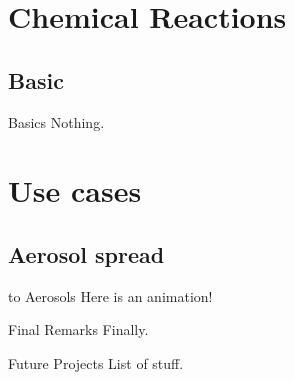 \documentclass[xcolor=dvipsnames]{beamer} %
\begin{document}
\section{Chemical Reactions}

\subsection{Basic}
\begin{frame}{Basics}
	Nothing.
\end{frame}

\section{Use cases}

\subsection{Aerosol spread}
\begin{frame}{ to Aerosols}
    Here is an animation!
\end{frame}

\begin{frame}{Final Remarks}
    Finally.
\end{frame}

\begin{frame}{Future Projects}
    List of stuff.
\end{frame}

\appendix
% 


\end{document}
